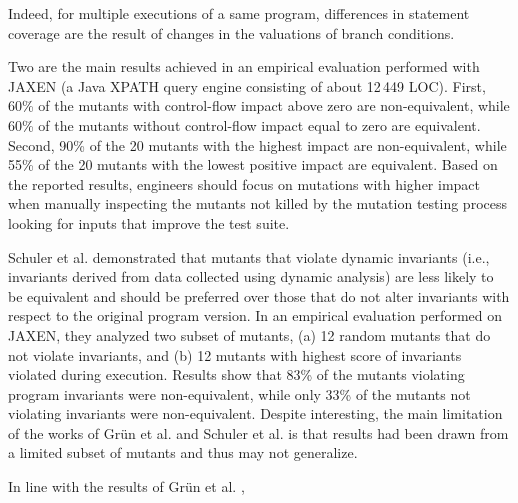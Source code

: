 Indeed, for multiple executions of a same program, differences in statement coverage are the result of changes in the valuations of branch conditions.

Two are the main results achieved in an empirical evaluation performed with JAXEN (a Java XPATH query engine consisting of about 12\,449 LOC). 
First, 60\% of the mutants with control-flow impact above zero are non-equivalent, while 60\% of the mutants without control-flow impact equal to zero are equivalent. 
Second, 90\% of the 20 mutants with the highest impact are non-equivalent, while 55\% of the 20 mutants with the lowest positive impact are equivalent. 
Based on the reported results, engineers should focus on mutations with higher impact when manually inspecting the mutants not killed by the mutation testing process looking for inputs that improve the test suite.

Schuler et al. \cite{schuler2009efficient} demonstrated that mutants that violate dynamic invariants (i.e., invariants derived from data collected using dynamic analysis) are less likely to be equivalent and should be preferred over those that do not alter invariants with respect to the original program version. In an empirical evaluation performed on JAXEN, they analyzed two subset of mutants, 
(a) 12 random mutants that do not violate invariants, and (b) 12 mutants with highest score of invariants violated during execution. 
Results show that 83\% of the mutants violating program invariants were non-equivalent, while only 33\% of 
the mutants not violating invariants were non-equivalent.
Despite interesting, the main limitation of the works of Gr\"{u}n et al. \cite{grun2009impact} and Schuler et al. \cite{schuler2009efficient} is that results had been drawn from a limited subset of mutants and thus may not generalize.

In line with the results of Gr\"{u}n et al. \cite{grun2009impact},


